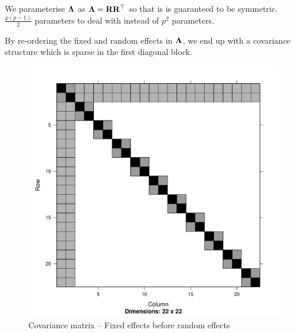 \documentclass[times, doublespace]{anzsauth}
\begin{document}
	We parameterise ${\boldsymbol \Lambda}$ as ${\boldsymbol \Lambda} = {\bf R} {\bf R}^\top$ so that is is guaranteed to be symmetric.
  $\frac{p(p-1)}{2}$ parameters to deal with instead of $p^2$ parameters.
	
	By re-ordering the fixed and random effects in ${\boldsymbol \Lambda}$, we end up with a covariance structure
	which is sparse in the first diagonal block.

	\begin{figure}[p]
		\includegraphics[scale=.25]{mX_mZ_mLambda.pdf}
		\caption{\tiny Covariance matrix -- Fixed effects before random effects}
	\end{figure}
\end{document}
